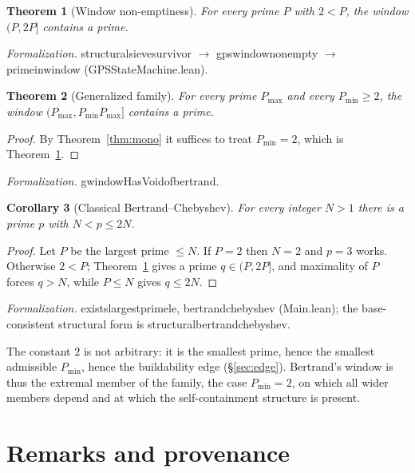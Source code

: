 \documentclass[11pt,a4paper]{amsart}
\theoremstyle{plain}
\newtheorem{theorem}{Theorem}[section]
\newtheorem{corollary}[theorem]{Corollary}
\theoremstyle{definition}
\theoremstyle{plain}
\theoremstyle{remark}
\newcommand{\lean}[1]{\begingroup\upshape\ttfamily\def\_{\textunderscore\allowbreak}#1\endgroup}
\newcommand{\Formal}[1]{\par\smallskip\noindent\begingroup\raggedright\emph{Formalization.} #1\par\endgroup\smallskip}
\begin{document}
\begin{theorem}[Window non-emptiness]\label{thm:window}
For every prime $P$ with $2<P$, the window $(P,2P]$ contains a prime.
\end{theorem}

\Formal{\lean{structural\_sieve\_survivor} $\to$ \lean{gps\_window\_nonempty} $\to$
\lean{prime\_in\_window} (\lean{GPS\_StateMachine.lean}).}

\begin{theorem}[Generalized family]\label{thm:gen}
For every prime $P_{\max}$ and every $P_{\min}\ge2$, the window
$(P_{\max},P_{\min}P_{\max}]$ contains a prime.
\end{theorem}

\begin{proof}
By Theorem~\ref{thm:mono} it suffices to treat $P_{\min}=2$, which is
Theorem~\ref{thm:window}.
\end{proof}

\Formal{\lean{gwindowHasVoid\_of\_bertrand}.}

\begin{corollary}[Classical Bertrand--Chebyshev]\label{cor:classical}
For every integer $N>1$ there is a prime $p$ with $N<p\le2N$.
\end{corollary}

\begin{proof}
Let $P$ be the largest prime $\le N$. If $P=2$ then $N=2$ and $p=3$ works. Otherwise
$2<P$; Theorem~\ref{thm:window} gives a prime $q\in(P,2P]$, and maximality of $P$ forces
$q>N$, while $P\le N$ gives $q\le2N$.
\end{proof}

\Formal{\lean{exists\_largest\_prime\_le}, \lean{bertrand\_chebyshev} (\lean{Main.lean});
the base-consistent structural form is \lean{structural\_bertrand\_chebyshev}.}

The constant $2$ is not arbitrary: it is the smallest prime, hence the smallest admissible
$P_{\min}$, hence the buildability edge (\S\ref{sec:edge}). Bertrand's window is thus the
extremal member of the family, the case $P_{\min}=2$, on which all wider members depend and
at which the self-containment structure is present.

\section{Remarks and provenance}
\label{sec:provenance}
\end{document}
